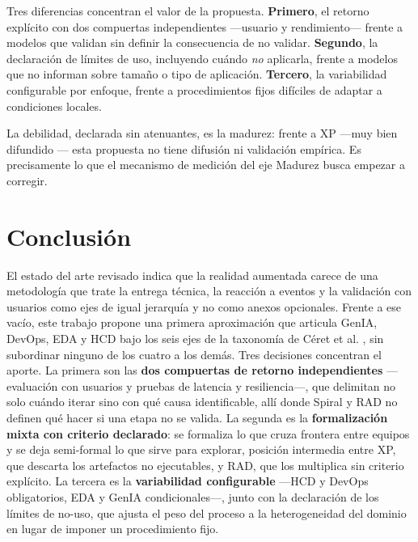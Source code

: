 \documentclass[conference]{IEEEtran}
\begin{document}
Tres diferencias concentran el valor de la propuesta. \textbf{Primero}, el retorno explícito con dos compuertas independientes —usuario y rendimiento— frente a modelos que validan sin definir la consecuencia de no validar. \textbf{Segundo}, la declaración de límites de uso, incluyendo cuándo \textit{no} aplicarla, frente a modelos que no informan sobre tamaño o tipo de aplicación. \textbf{Tercero}, la variabilidad configurable por enfoque, frente a procedimientos fijos difíciles de adaptar a condiciones locales.

La debilidad, declarada sin atenuantes, es la madurez: frente a XP —muy bien difundido \cite{Ceret2013}— esta propuesta no tiene difusión ni validación empírica. Es precisamente lo que el mecanismo de medición del eje Madurez busca empezar a corregir.

\section{Conclusión}

El estado del arte revisado indica que la realidad aumentada carece de una metodología que trate la entrega técnica, la reacción a eventos y la validación con usuarios como ejes de igual jerarquía y no como anexos opcionales. Frente a ese vacío, este trabajo propone una primera aproximación que articula GenIA, DevOps, EDA y HCD bajo los seis ejes de la taxonomía de Céret et al. \cite{Ceret2013}, sin subordinar ninguno de los cuatro a los demás. Tres decisiones concentran el aporte. La primera son las \textbf{dos compuertas de retorno independientes} —evaluación con usuarios y pruebas de latencia y resiliencia—, que delimitan no solo cuándo iterar sino con qué causa identificable, allí donde Spiral y RAD no definen qué hacer si una etapa no se valida. La segunda es la \textbf{formalización mixta con criterio declarado}: se formaliza lo que cruza frontera entre equipos y se deja semi-formal lo que sirve para explorar, posición intermedia entre XP, que descarta los artefactos no ejecutables, y RAD, que los multiplica sin criterio explícito. La tercera es la \textbf{variabilidad configurable} —HCD y DevOps obligatorios, EDA y GenIA condicionales—, junto con la declaración de los límites de no-uso, que ajusta el peso del proceso a la heterogeneidad del dominio en lugar de imponer un procedimiento fijo.
\end{document}
